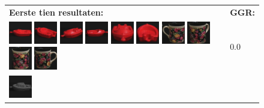 \begin{figure}[tbp]
\begin{center}
\begin{tabular}{m{11cm} | m{3cm} |}
\textbf{Eerste tien resultaten:} & \textbf{GGR:} \\
\vspace{4pt}
\includegraphics[width=1cm]{coil/beeld-18.eps}
\includegraphics[width=1cm]{coil/beeld-22.eps}
\includegraphics[width=1cm]{coil/beeld-21.eps}
\includegraphics[width=1cm]{coil/beeld-19.eps}
\includegraphics[width=1cm]{coil/beeld-20.eps}
\includegraphics[width=1cm]{coil/beeld-23.eps}
\includegraphics[width=1cm]{coil/beeld-61.eps}
\includegraphics[width=1cm]{coil/beeld-63.eps}
\includegraphics[width=1cm]{coil/beeld-62.eps}
\includegraphics[width=1cm]{coil/beeld-60.eps}
& {\scriptsize 0.0}
\\
\includegraphics[width=1cm]{coil/beeld-24.eps}

\end{tabular}
\end{center}
\end{figure}
